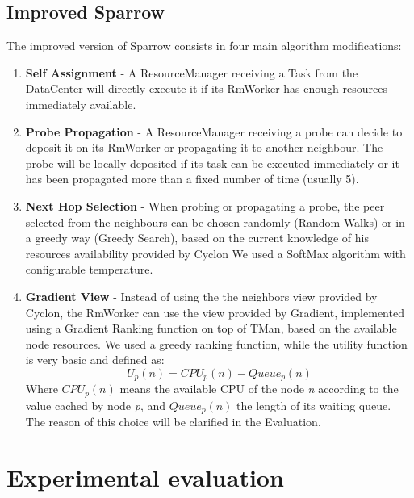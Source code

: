 \documentclass[conference]{IEEEtran}
\begin{document}
  \subsection{Improved Sparrow}
  The improved version of Sparrow consists in four main algorithm modifications:
   \begin{enumerate}

  \item \textbf{Self Assignment }- A ResourceManager receiving a Task from the DataCenter will directly execute it if its RmWorker has enough resources immediately available.
  
  \item \textbf{Probe Propagation} - A ResourceManager receiving a probe can decide to deposit it on its RmWorker or propagating it to another neighbour.  The probe will be locally deposited if its task can be executed immediately or it has been propagated more than a fixed number of time (usually 5).
  
   \item \textbf{Next Hop Selection} - When probing or propagating a probe, the peer selected from the neighbours can be chosen randomly (Random Walks) or in a greedy way (Greedy Search), based on the current knowledge of his resources availability provided by Cyclon We used a SoftMax algorithm with configurable temperature.
  
  \item \textbf{Gradient View} - Instead of using the the neighbors view provided by Cyclon, the RmWorker can use the view provided by Gradient, implemented using a Gradient Ranking function on top of TMan, based on the available node resources. We used a greedy ranking function, while the utility function is very basic and defined as:
\begin{equation}
 U_p(n) = CPU_p(n) - Queue_p(n)
\end{equation}
Where $CPU_p(n)$ means the available CPU of the node \textit{n} according to the value cached by node\textit{ p}, and $Queue_p(n)$ the length of its waiting queue.
   The reason of this choice will be clarified in the Evaluation.
  
  \end{enumerate}

\section{Experimental evaluation}
\end{document}
